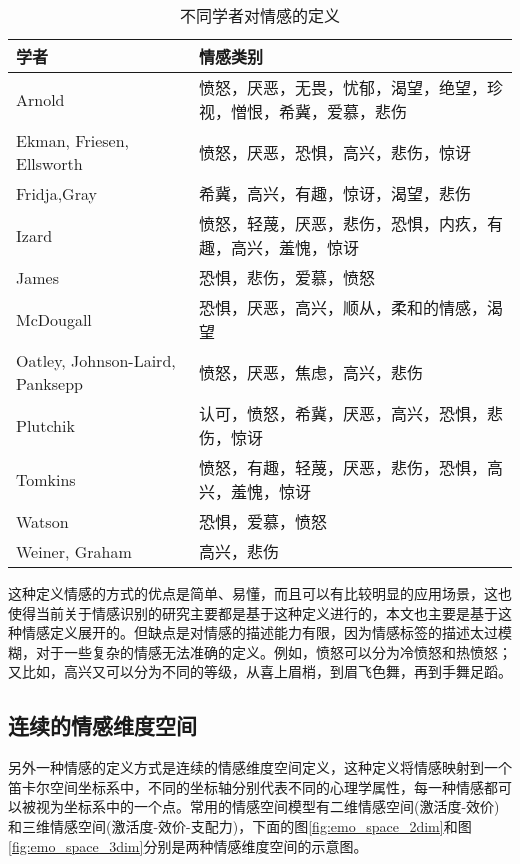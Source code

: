 \begin{table}[htb]
  \centering
  \begin{minipage}[t]{0.8\linewidth} %
  \caption{不同学者对情感的定义}
  \label{tab:emo_categories}
    \begin{tabularx}{\linewidth}{X<{\centering} X<{\centering}}
        \toprule[1.5pt]
        学者 & 情感类别 \\
        \midrule[1pt]
        Arnold & 愤怒，厌恶，无畏，忧郁，渴望，绝望，珍视，憎恨，希冀，爱慕，悲伤 \\
        Ekman, Friesen, Ellsworth & 愤怒，厌恶，恐惧，高兴，悲伤，惊讶 \\
        Fridja,Gray & 希冀，高兴，有趣，惊讶，渴望，悲伤 \\
        Izard & 愤怒，轻蔑，厌恶，悲伤，恐惧，内疚，有趣，高兴，羞愧，惊讶 \\
        James & 恐惧，悲伤，爱慕，愤怒 \\
        McDougall & 恐惧，厌恶，高兴，顺从，柔和的情感，渴望 \\
        Oatley, Johnson-Laird, Panksepp & 愤怒，厌恶，焦虑，高兴，悲伤 \\
        Plutchik & 认可，愤怒，希冀，厌恶，高兴，恐惧，悲伤，惊讶 \\
        Tomkins & 愤怒，有趣，轻蔑，厌恶，悲伤，恐惧，高兴，羞愧，惊讶 \\
        Watson & 恐惧，爱慕，愤怒 \\
        Weiner, Graham & 高兴，悲伤 \\
        \bottomrule[1.5pt]
    \end{tabularx}
  \end{minipage}
\end{table}

这种定义情感的方式的优点是简单、易懂，而且可以有比较明显的应用场景，这也使得当前关于情感识别的研究主要都是基于这种定义进行的，本文也主要是基于这种情感定义展开的。但缺点是对情感的描述能力有限，因为情感标签的描述太过模糊，对于一些复杂的情感无法准确的定义。例如，愤怒可以分为冷愤怒和热愤怒；又比如，高兴又可以分为不同的等级，从喜上眉梢，到眉飞色舞，再到手舞足蹈。

\subsection{连续的情感维度空间}
\label{ssec:continuous_space}
另外一种情感的定义方式是连续的情感维度空间定义，这种定义将情感映射到一个笛卡尔空间坐标系中，不同的坐标轴分别代表不同的心理学属性，每一种情感都可以被视为坐标系中的一个点。常用的情感空间模型有二维情感空间(激活度-效价)和三维情感空间(激活度-效价-支配力)，下面的图\ref{fig:emo_space_2dim}和图\ref{fig:emo_space_3dim}分别是两种情感维度空间的示意图。

